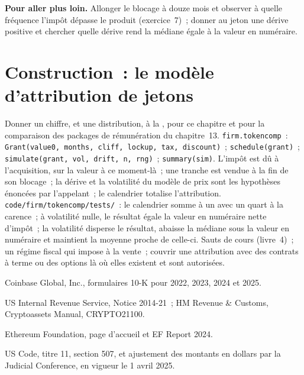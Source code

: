 \textbf{Pour aller plus loin.} Allonger le blocage à douze mois et observer à quelle fréquence l'impôt dépasse le produit
(exercice~7)~; donner au jeton une dérive positive et chercher quelle dérive rend la médiane égale à la valeur en numéraire.

\section{Construction~: le modèle d'attribution de jetons}\label{bld:in:crypto-native-firms:tokencomp}

\begin{build}
 Donner un chiffre, et une distribution, à la , pour ce chapitre et pour la comparaison des
packages de rémunération du chapitre~13.
 \texttt{firm.tokencomp}~: \texttt{Grant(value0, months, cliff, lockup, tax, discount)}~;
\texttt{schedule(grant)}~; \texttt{simulate(grant, vol, drift, n, rng)}~; \texttt{summary(sim)}.
 L'impôt est dû à l'acquisition, sur la valeur à ce moment-là~; une tranche est vendue à la fin de son blocage~; la dérive et la volatilité du modèle de prix
sont les hypothèses énoncées par l'appelant~; le calendrier totalise l'attribution.
 \texttt{code/firm/tokencomp/tests/}~: le calendrier somme à un avec un quart à la carence~; à
volatilité nulle, le résultat égale la valeur en numéraire nette d'impôt~; la volatilité disperse le résultat, abaisse la médiane sous
la valeur en numéraire et maintient la moyenne proche de celle-ci.
 Sauts de cours (livre~4)~; un régime fiscal qui impose à la vente~; couvrir une attribution avec des contrats à terme ou des options
là où elles existent et sont autorisées.
\end{build}

\begin{omsources}
\item Coinbase Global, Inc., formulaires 10-K pour 2022, 2023, 2024 et 2025.
\item US Internal Revenue Service, Notice 2014-21~; HM Revenue \& Customs, Cryptoassets Manual, CRYPTO21100.
\item Ethereum Foundation, page d'accueil et EF Report 2024.
\item US Code, titre 11, section 507, et ajustement des montants en dollars par la Judicial Conference, en vigueur le 1 avril 2025.
\end{omsources}

